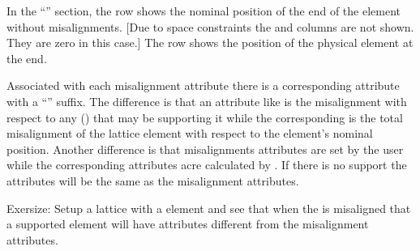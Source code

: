 \documentclass{hitec}
\begin{document}
In the ``'' section, the  row shows the nominal position of
the  end of the element without misalignments. [Due to space constraints the  and
 columns are not shown. They are zero in this case.] The  row shows the position
of the physical element at the  end.

Associated with each misalignment attribute there is a corresponding attribute with a ``''
suffix. The difference is that an attribute like  is the misalignment with respect to
any  () that may be supporting it while the corresponding
 is the total misalignment of the lattice element with respect to the element's
nominal position. Another difference is that misalignments attributes are set by the user while the
corresponding  attributes acre calculated by \bmad. If there is no  support the 
 attributes will be the same as the misalignment attributes.

Exersize: Setup a lattice with a  element and see that when the  is misaligned
that a supported element will have  attributes different from the misalignment attributes.

\newpage
\end{document}
